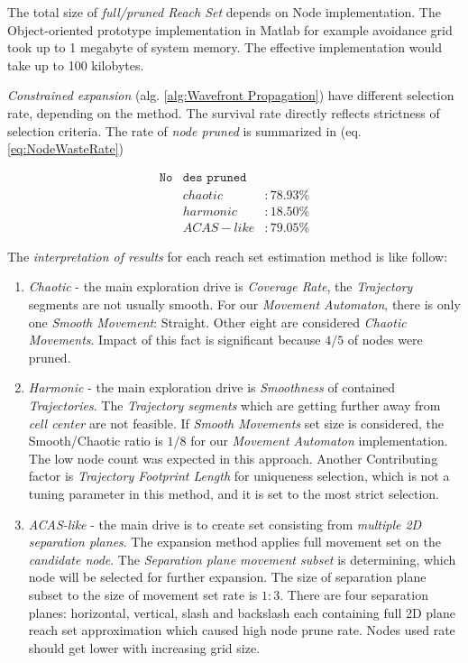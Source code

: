 \begin{note}
    The total size of \emph{full/pruned Reach Set} depends on Node implementation. The Object-oriented prototype implementation in Matlab for example avoidance grid took up to 1 megabyte of system memory. The effective implementation would take up to 100 kilobytes.
\end{note}

\emph{Constrained expansion} (alg. \ref{alg:Wavefront Propagation}) have different selection rate, depending on the method. The survival rate directly reflects strictness of selection criteria. The rate of \emph{node pruned} is summarized in (eq.\ref{eq:NodeWasteRate})  

\begin{equation}\label{eq:NodeWasteRate}
    \begin{aligned}
        \texttt{No} & \texttt{des } \texttt{pruned}\\
        &chaotic   &: 78.93 \%\\
        &harmonic  &: 18.50 \%\\
        &ACAS-like &: 79.05 \%
    \end{aligned}
\end{equation}

\noindent The \emph{interpretation of results} for each reach set estimation method is like follow: 

\begin{enumerate}
    \item \emph{Chaotic} - the main exploration drive  is \emph{Coverage Rate}, the \emph{Trajectory} segments are not usually smooth. For our \emph{Movement Automaton}, there is only one \emph{Smooth Movement}: Straight. Other eight are considered \emph{Chaotic Movements}. Impact of this fact is significant because $4/5$ of nodes were pruned.
    
    \item \emph{Harmonic} - the main exploration drive is \emph{Smoothness} of contained \emph{Trajectories}. The \emph{Trajectory segments} which are getting further away from \emph{cell center} are not feasible. If \emph{Smooth Movements} set size is considered, the Smooth/Chaotic ratio is $1/8$ for our \emph{Movement Automaton} implementation. The low node count was expected in this approach. Another Contributing factor is \emph{Trajectory Footprint Length} for uniqueness selection, which is not a tuning parameter in this method, and it is set to the most strict selection.
    
    \item \emph{ACAS-like} - the main drive is to create set consisting from \emph{multiple 2D separation planes}. The expansion method applies full movement set on the \emph{candidate node}. The \emph{Separation plane movement subset} is determining, which node will be selected for further expansion. The size of separation plane subset to the size of movement set rate is $1:3$. There are four separation planes: horizontal, vertical, slash and backslash each containing full 2D plane reach set approximation which caused high node prune rate. Nodes used rate should get lower with increasing grid size.
    
\end{enumerate}

